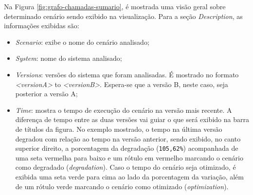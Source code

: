 Na Figura \ref{fig:grafo-chamadas-sumario}, é mostrada uma visão geral sobre determinado cenário sendo exibido na visualização. Para a seção \textit{Description}, as informações exibidas são:
\begin{itemize}
   \item \textit{Scenario}: exibe o nome do cenário analisado;
   \item \textit{System}: nome do sistema analisado;
   \item \textit{Versions}: versões do sistema que foram analisadas. É mostrado no formato \textit{<versionA>} to \textit{<versionB>}. Espera-se que a versão B, neste caso, seja posterior a versão A;
   \item \textit{Time}: mostra o tempo de execução do cenário na versão mais recente. A diferença de tempo entre as duas versões vai guiar o que será exibido na barra de títulos da figura. No exemplo mostrado, o tempo na última versão degradou com relação ao tempo na versão anterior, sendo exibido, no canto superior direito, a porcentagem da degradação (\texttt{105,62\%}) acompanhada de uma seta vermelha para baixo e um rótulo em vermelho marcando o cenário como degradado (\textit{degradation}). Caso o tempo do cenário seja otimizado, é exibida uma seta verde para cima ao lado da porcentagem da variação, além de um rótulo verde marcando o cenário como otimizado (\textit{optimization}).
\end{itemize}


